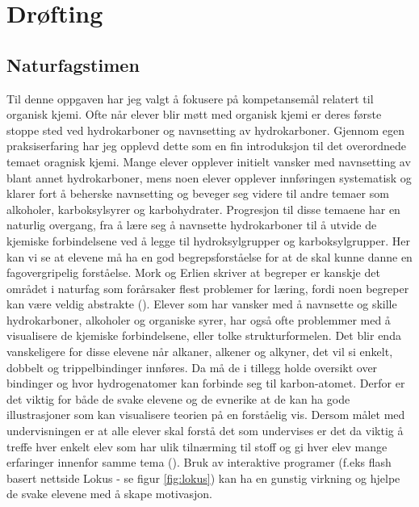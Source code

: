 \documentclass[main.tex]{subfiles}
\begin{document}
\section*{Drøfting}

\subsection*{Naturfagstimen}
Til denne oppgaven har jeg valgt å fokusere på kompetansemål relatert til organisk kjemi. Ofte når elever blir møtt med organisk kjemi er deres første stoppe sted ved hydrokarboner og navnsetting av hydrokarboner. Gjennom egen praksiserfaring har jeg opplevd dette som en fin introduksjon til det overordnede temaet oragnisk kjemi. Mange elever opplever initielt vansker med navnsetting av blant annet hydrokarboner, mens noen elever opplever innføringen systematisk og klarer fort å beherske navnsetting og beveger seg videre til andre temaer som alkoholer, karboksylsyrer og karbohydrater. Progresjon til disse temaene har en naturlig overgang, fra å lære seg å navnsette hydrokarboner til å utvide de kjemiske forbindelsene ved å legge til hydroksylgrupper og karboksylgrupper. Her kan vi se at elevene må ha en god begrepsforståelse for at de skal kunne danne en fagovergripelig forståelse. Mork og Erlien skriver at begreper er kanskje det området i naturfag som forårsaker flest problemer for læring, fordi noen begreper kan være veldig abstrakte ().
\newline\newline
Elever som har vansker med å navnsette og skille hydrokarboner, alkoholer og organiske syrer, har også ofte problemmer med å visualisere de kjemiske forbindelsene, eller tolke strukturformelen. Det blir enda vanskeligere for disse elevene når alkaner, alkener og alkyner, det vil si enkelt, dobbelt og trippelbindinger innføres. Da må de i tillegg holde oversikt over bindinger og hvor hydrogenatomer kan forbinde seg til karbon-atomet. Derfor er det viktig for både de svake elevene og de evnerike at de kan ha gode illustrasjoner som kan visualisere teorien på en forståelig vis. Dersom målet med undervisningen er at alle elever skal forstå det som undervises er det da viktig å treffe  hver enkelt elev som har ulik tilnærming til stoff og gi hver elev mange erfaringer innenfor samme tema (). Bruk av interaktive programer (f.eks flash basert nettside Lokus - se figur \ref{fig:lokus}) kan ha en gunstig virkning og hjelpe de svake elevene med å skape motivasjon.
\end{document}
